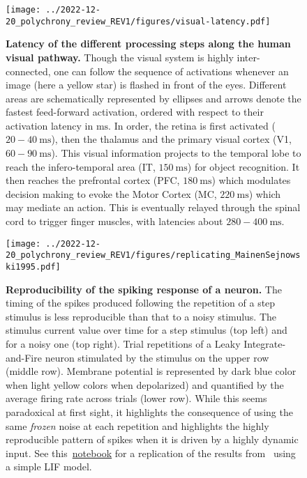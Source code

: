 \documentclass[brainsci, %
               review,submit,pdftex,moreauthors
               ]{Definitions/mdpi}
\newcommand{\ms}{\si{\milli\second}}%
\begin{document}
\begin{figure}[H]
  \centering
  \texttt{[image: ../2022-12-20\_polychrony\_review\_REV1/figures/visual-latency.pdf]}
  \caption{{\bf Latency of the different processing steps along the human visual pathway.} Though the visual system is highly inter-connected, one can follow the sequence of activations whenever an image (here a yellow star) is flashed in front of the eyes. Different areas are schematically represented by ellipses and arrows denote the fastest feed-forward activation, ordered with respect to their activation latency in $\ms$. In order, the retina is first activated ($20-40~\ms$), then the thalamus and the primary visual cortex (V1, $60-90~\ms$). This visual information  projects to the temporal lobe to reach the infero-temporal area (IT, $150~\ms$) for object recognition. It then reaches the prefrontal cortex (PFC, $180~\ms$) which modulates decision making to evoke the Motor Cortex (MC, $220~\ms$) which may mediate an action. This is eventually relayed through the spinal cord to trigger finger muscles, with latencies about $280-400~\ms$.}\label{fig:thorpe}
  \end{figure}
  \vspace{-6pt}

\begin{figure}[H]
  \centering
  \texttt{[image: ../2022-12-20\_polychrony\_review\_REV1/figures/replicating\_MainenSejnowski1995.pdf]} 
  \caption{\textbf{Reproducibility of the spiking response of a neuron. }The timing of the spikes produced following the repetition of a step stimulus is less reproducible than that to a noisy stimulus. The stimulus current value over time for a step stimulus (top left) and for a noisy one (top right). Trial repetitions of a Leaky Integrate-and-Fire neuron stimulated by the stimulus on the upper row (middle row). Membrane potential is represented by dark blue color when light yellow colors when depolarized) and quantified by the average firing rate across trials (lower row). While this seems paradoxical at first sight, it highlights the consequence of using the same \emph{frozen} noise at each repetition and highlights the highly reproducible pattern of spikes when it is driven by a highly dynamic input. See this~\href{https://github.com/laurentperrinet/2022_UE-neurosciences-computationnelles/blob/master/C_MainenSejnowski1995_Perrinet.ipynb}{notebook} for a replication of the results from~\citep{mainen_reliability_1995} using a simple LIF model.}\label{fig:mainen}
  \end{figure}
\end{document}
